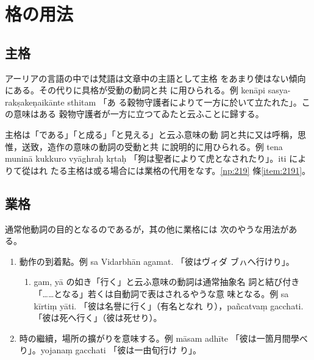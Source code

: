 \section{格の用法}
\subsection{主格}
\numberParagraph
アーリアの言語の中では梵語は文章中の主語として主格
をあまり使はない傾向にある。その代りに具格が受動の動詞と共
に用ひられる。例 kenāpi sasya-rakṣakeṇaikānte sthitam 「あ
る穀物守護者によりて一方に於いて立たれた」。この意味はある
穀物守護者が一方に立つてゐたと云ふことに歸する。

\numberParagraph
主格は「である」「と成る」「と見える」と云ふ意味の動
詞と共に又は呼稱，思惟，送致，造作の意味の動詞の受動と共
に說明的に用ひられる。例 tena muninā kukkuro vyāghraḥ
kṛtaḥ 「狗は聖者によりて虎となされたり」。iti によりて從はれ
たる主格は或る場合には業格の代用をなす。\ref{np:219} 條\ref{item:2191}。

\subsection{業格}
\numberParagraph
通常他動詞の目的となるのであるが，其の他に業格には
次のやうな用法がある。
\begin{enumerate}[label=(\arabic*)]
\item 動作の到着點。例 sa Vidarbhān agamat. 「彼はヴィダ
ブㇵへ行けり」。
\
\begin{enumerate}[label=(\alph*)]
\item gam, yā の如き「行く」と云ふ意味の動詞は通常抽象名
詞と結び付き「……となる」若くは自動詞で表はされるやうな意
味となる。例 sa kīrtiṃ yāti. 「彼は名譽に行く」（有名となれ
り），pañcatvaṃ gacchati. 「彼は死へ行く」（彼は死せり）。
\end{enumerate}
\item 時の繼續，場所の擴がりを意味する。例 māsam adhīte
「彼は一箇月間學べり」。yojanaṃ gacchati 「彼は一由旬行け
り」。
\end{enumerate}

